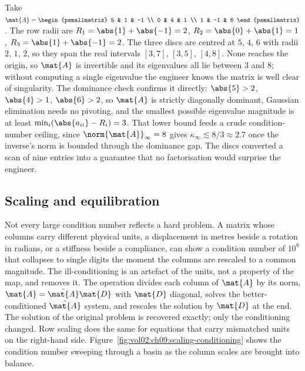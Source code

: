 \begin{example}
Take $\mat{A} = \begin{psmallmatrix} 5 & 1 & -1 \\ 0 & 4 & 1 \\ 1 & -1
& 6 \end{psmallmatrix}$. The row radii are $R_{1} = \abs{1} + \abs{-1}
= 2$, $R_{2} = \abs{0} + \abs{1} = 1$, $R_{3} = \abs{1} + \abs{-1} =
2$. The three discs are centred at $5$, $4$, $6$ with radii $2$, $1$,
$2$, so they span the real intervals $[3, 7]$, $[3, 5]$, $[4, 8]$. None
reaches the origin, so $\mat{A}$ is invertible and its eigenvalues all
lie between $3$ and $8$; without computing a single eigenvalue the
engineer knows the matrix is well clear of singularity. The dominance
check confirms it directly: $\abs{5} > 2$, $\abs{4} > 1$, $\abs{6} >
2$, so $\mat{A}$ is strictly diagonally dominant, Gaussian elimination
needs no pivoting, and the smallest possible eigenvalue magnitude is at
least $\min_{i}(\abs{a_{ii}} - R_{i}) = 3$. That lower bound feeds a
crude condition-number ceiling, since $\norm{\mat{A}}_{\infty} = 8$
gives $\kappa_{\infty} \lesssim 8/3 \approx 2.7$ once the inverse's
norm is bounded through the dominance gap. The discs converted a scan
of nine entries into a guarantee that no factorisation would surprise
the engineer.
\end{example}

\subsection{Scaling and equilibration}

Not every large condition number reflects a hard problem. A matrix
whose columns carry different physical units, a displacement in metres
beside a rotation in radians, or a stiffness beside a compliance, can
show a condition number of $10^{8}$ that collapses to single digits the
moment the columns are rescaled to a common magnitude. The
ill-conditioning is an artefact of the units, not a property of the map,
and  removes it. The operation divides each
column of $\mat{A}$ by its norm, $\mat{A} = \tilde{\mat{A}}\mat{D}$ with
$\mat{D}$ diagonal, solves the better-conditioned $\tilde{\mat{A}}$
system, and rescales the solution by $\mat{D}$ at the end. The solution
of the original problem is recovered exactly; only the conditioning
changed. Row scaling does the same for equations that carry mismatched
units on the right-hand side.
Figure~\ref{fig:vol02:ch09:scaling-conditioning} shows the condition
number sweeping through a basin as the column scales are brought into
balance.

